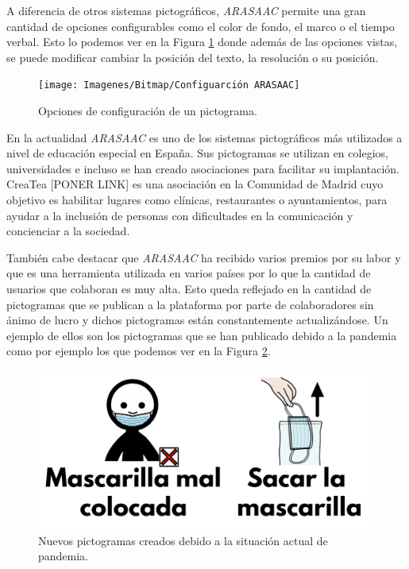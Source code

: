 A diferencia de otros sistemas pictográficos, \textit{ARASAAC} permite una gran cantidad de opciones configurables como el color de fondo, el marco o el tiempo verbal. Esto lo podemos ver en la Figura \ref{fig:configuarcion-arasaac} donde además de las opciones vistas, se puede modificar cambiar la posición del texto, la resolución o su posición.



\begin{figure}[h!]
	\centering
	\texttt{[image: Imagenes/Bitmap/Configuarción ARASAAC]}
	\caption{Opciones de configuración de un pictograma.}
	\label{fig:configuarcion-arasaac}
\end{figure}



En la actualidad \textit{ARASAAC} es uno de los sistemas pictográficos más utilizados a nivel de educación especial en España. Sus pictogramas se utilizan en colegios, universidades e incluso se han creado asociaciones para facilitar su implantación. CreaTea [PONER LINK] es una asociación en la Comunidad de Madrid cuyo objetivo es habilitar lugares como clínicas, restaurantes o ayuntamientos, para ayudar a la inclusión de personas con dificultades en la comunicación y concienciar a la sociedad.

También cabe destacar que \textit{ARASAAC} ha recibido varios premios por su labor y que es una herramienta utilizada en varios países por lo que la cantidad de usuarios que colaboran es muy alta. Esto queda reflejado en la cantidad de pictogramas que se publican a la plataforma por parte de colaboradores sin ánimo de lucro y dichos pictogramas están constantemente actualizándose. Un ejemplo de ellos son los pictogramas que se han publicado debido a la pandemia como por ejemplo los que podemos ver en la Figura \ref{fig:ejemplosdepictos}.


\begin{figure}[h!]
	\centering
	\includegraphics[width=0.7\linewidth]{Imagenes/Bitmap/ejemplosdepictos}
	\caption{Nuevos pictogramas creados debido a la situación actual de pandemia. }
	\label{fig:ejemplosdepictos}
\end{figure}




